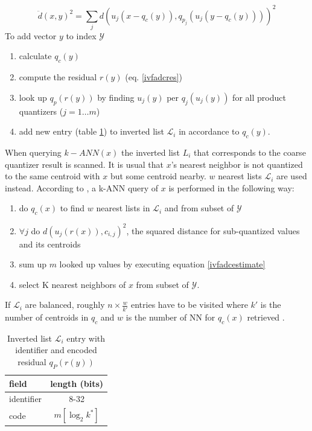 \documentclass[english,12pt,a4paper,pdftex,elec,utf8, table]{aaltothesis}
\begin{document}
\begin{equation}
  \label{ivfadcestimate}
  \ddot{d}(x,y)^2 = \sum_jd\left(u_j(x-q_c(y)), q_{p_j}(u_j(y-q_c(y)))\right)^2
\end{equation}
To add vector $y$ to index $\mathcal{Y}$
\begin{enumerate}
\item calculate $q_c(y)$
\item compute the residual $r(y)$ (eq. \ref{ivfadcres})
\item look up $q_p(r(y))$ by finding $u_j(y)$ per $q_j(u_j(y))$ for all product quantizers ($j = 1 \ldots m$)
\item add new entry (table \ref{ivfadcentry}) to inverted list $\mathcal{L}_i$ in accordance to $q_c(y)$.
\end{enumerate}
When querying $k-ANN(x)$ the inverted list $L_i$ that corresponds to the coarse quantizer result is scanned. It is usual that $x$'s nearest neighbor is not quantized to the same centroid with $x$ but some centroid nearby. $w$ nearest lists $\mathcal{L}_i$ are used instead. According to \cite{Jegou2008}, a k-ANN query of $x$ is performed in the following way:
\begin{enumerate}
\item do $q_c(x)$ to find $w$ nearest lists in $\mathcal{L}_i$ and from subset of $\mathcal{Y}$
\item $\forall j$ do $d(u_j(r(x)), c_{i,j})^2$, the squared distance for sub-quantized values and its centroids
\item sum up $m$ looked up values by executing equation \ref{ivfadcestimate}
  \item select K nearest neighbors of $x$ from subset of $\mathcal{Y}$.
\end{enumerate}
If $\mathcal{L}_i$ are balanced, roughly $n \times \frac{w}{k'}$ entries have to be visited where $k'$ is the number of centroids in $q_c$ and $w$ is the number of NN for $q_c(x)$ retrieved \cite{Jegou2008}.

\def\arraystretch{1.5}
\begin{table}[htb]
\caption{Inverted list $\mathcal{L}_i$ entry with identifier and encoded residual $q_P(r(y))$ \cite{Jegou2008}}
\label{ivfadcentry}
\begin{center}
\begin{tabular}{lc}
  field & length (bits)\\
  \hline
  identifier&8-32\\
  code & $m[\log_2k^*]$\\
\end{tabular}
\end{center}\end{table}
\end{document}
